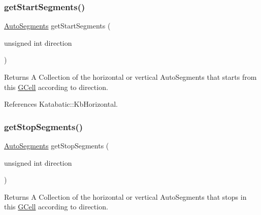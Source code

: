 \mbox{\label{classKatabatic_1_1GCell_a1f92568d22b1384a8cdf328340fb9160}} 
\subsubsection{\texorpdfstring{get\+Start\+Segments()}{getStartSegments()}}
{\footnotesize\ttfamily \hyperlink{namespaceKatabatic_a2221b0ddbc24f331809fc86f98e38041}{Auto\+Segments} get\+Start\+Segments (\begin{DoxyParamCaption}\item[{unsigned int}]{direction }\end{DoxyParamCaption})\hspace{0.3cm}{\ttfamily [inline]}}

\begin{DoxyReturn}{Returns}
A Collection of the horizontal or vertical Auto\+Segments that starts from this \hyperlink{classKatabatic_1_1GCell}{G\+Cell} according to {\ttfamily direction}. 
\end{DoxyReturn}


References Katabatic\+::\+Kb\+Horizontal.

\mbox{\label{classKatabatic_1_1GCell_a80ad0f9e79bccf6aed4fb69b4b795005}} 
\subsubsection{\texorpdfstring{get\+Stop\+Segments()}{getStopSegments()}}
{\footnotesize\ttfamily \hyperlink{namespaceKatabatic_a2221b0ddbc24f331809fc86f98e38041}{Auto\+Segments} get\+Stop\+Segments (\begin{DoxyParamCaption}\item[{unsigned int}]{direction }\end{DoxyParamCaption})\hspace{0.3cm}{\ttfamily [inline]}}

\begin{DoxyReturn}{Returns}
A Collection of the horizontal or vertical Auto\+Segments that stops in this \hyperlink{classKatabatic_1_1GCell}{G\+Cell} according to {\ttfamily direction}. 
\end{DoxyReturn}


